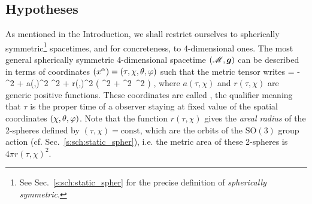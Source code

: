 \subsection{Hypotheses} \label{s:lem:hyp}

As mentioned in the Introduction, we shall restrict ourselves to
spherically symmetric\footnote{See Sec.~\ref{s:sch:static_spher} for the precise
definition of \emph{spherically symmetric}.} spacetimes, and for concreteness, to 4-dimensional ones. The most general spherically symmetric 4-dimensional spacetime $(\mathscr{M},\bm{g})$
can be described in terms of coordinates $(x^\alpha)=(\tau,\chi,\theta,\varphi)$ such that
the metric tensor writes
\be \label{e:lem:metric_sync_coord}
     = - \dd\tau^2 + a(\tau,\chi)^2 \dd\chi^2
        + r(\tau,\chi)^2 \left( \dd\th^2 + \sin^2\th\, \dd\ph^2 \right)  ,
\ee
where $a(\tau,\chi)$ and $r(\tau,\chi)$ are generic positive functions.
These coordinates are called
, the qualifier
 meaning that $\tau$ is the proper time of a observer staying
at fixed value of the spatial coordinates $(\chi,\theta,\varphi)$.
Note that the function $r(\tau,\chi)$ gives the \emph{areal radius}
of the 2-spheres
defined by $(\tau,\chi) = \mathrm{const}$, which are the orbits of the $\mathrm{SO}(3)$
group action (cf. Sec.~\ref{s:sch:static_spher}), i.e. the metric area of these
2-spheres is $4\pi r(\tau,\chi)^2$.

